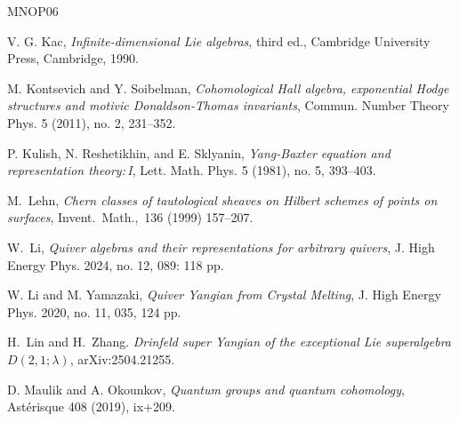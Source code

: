 \documentclass[10pt]{amsart}
\theoremstyle{definition}
\numberwithin{equation}{section}
\begin{document}
\begin{thebibliography}{MNOP06}









 V. G. Kac, \textit{Infinite-dimensional Lie algebras}, third ed., Cambridge University Press, Cambridge, 1990.

 M. Kontsevich and Y. Soibelman, \textit{Cohomological Hall algebra, exponential Hodge structures and motivic Donaldson-Thomas invariants}, Commun. Number Theory Phys. 5 (2011), no. 2, 231--352.

 P. Kulish, N. Reshetikhin, and E. Sklyanin, \textit{Yang-Baxter equation and representation theory:\,I}, Lett. Math. Phys. 5 (1981), no. 5, 393--403.


 M.~Lehn, \textit{Chern classes of tautological sheaves on Hilbert schemes of points on surfaces}, Invent.~Math.,~136 (1999) 157--207.


 W.~Li, \textit{Quiver algebras and their representations for arbitrary quivers}, J. High Energy Phys. 2024, no. 12, 089: 118 pp.


W. Li and M. Yamazaki, \textit{Quiver Yangian from Crystal Melting}, J. High Energy Phys. 2020, no. 11, 035, 124 pp.

 H.~Lin and H.~Zhang. \textit{Drinfeld super Yangian of the exceptional Lie superalgebra $ D(2, 
1;\lambda)$}, arXiv:2504.21255.


D. Maulik and A. Okounkov, \emph{Quantum groups and quantum cohomology}, Ast\'erisque 408 (2019), ix+209. 


\end{thebibliography}
\end{document}
